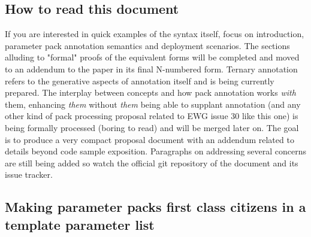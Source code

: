 
\subsection{How to read this document}

\p If you are interested in quick examples of the syntax itself, focus on introduction, parameter pack annotation semantics and deployment scenarios.
The sections alluding to "formal" proofs of the equivalent forms will be completed and moved to an addendum to the paper in its final N-numbered form.
Ternary annotation refers to the generative aspects of annotation itself and is being currently prepared.
The interplay between concepts \cite{Stroustrup2012,Sutton2013} and how pack annotation works \textit{with} them, enhancing \textit{them} without \textit{them} being able to supplant annotation (and any other kind of pack processing proposal related to EWG issue 30 \cite{Abrahams2012} like this one) is being formally processed (boring to read) and will be merged later on.
The goal is to produce a very compact proposal document with an addendum related to details beyond code sample exposition.
Paragraphs on addressing several concerns are still being added so watch the official git repository of the document and its issue tracker.

\subsection{Making parameter packs first class citizens in a template parameter list}

